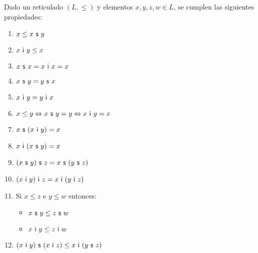   \begin{lemma} \label{lemma_2}
    \PN Dado un reticulado $(L, \leq)$ y elementos $x, y, z, w \in L$, se cumplen las siguientes propiedades:
    \begin{multicols}{2}
      \begin{enumerate}[(1)]
        \item $x \leq x \ \mathsf{s} \ y$
        \item $x \ \mathsf{i} \ y \leq x$
        \item $x \ \mathsf{s} \ x = x \ \mathsf{i} \ x = x$
        \item $x \ \SU \ y = y \ \SU \ x$
        \item $x \ \IN \ y = y \ \IN \ x$
        \item $x \leq y \Leftrightarrow x \ \mathsf{s} \ y = y \Leftrightarrow x \ \mathsf{i} \ y = x$
        \item $x \ \mathsf{s} \ (x \ \mathsf{i} \ y) = x$
        \item $x \ \mathsf{i} \ (x \ \mathsf{s} \ y) = x$
        \item $(x \ \mathsf{s} \ y) \ \mathsf{s} \ z = x \ \mathsf{s} \ (y \ \mathsf{s} \ z)$
        \item $(x \ \mathsf{i} \ y) \ \mathsf{i} \ z = x \ \mathsf{i} \ (y \ \mathsf{i} \ z)$
        \item Si $x \leq z$ e $y \leq w$ entonces:
          \begin{itemize}
            \item $x \ \SU \ y \leq z \ \SU \ w$
            \item $x \ \IN \ y \leq z \ \IN \ w$
          \end{itemize}
        \item $(x \ \mathsf{i} \ y) \ \mathsf{s} \ (x \ \mathsf{i} \ z) \leq x \ \mathsf{i} \ (y \ \mathsf{s} \ z)$
      \end{enumerate}
    \end{multicols}
  \end{lemma}
